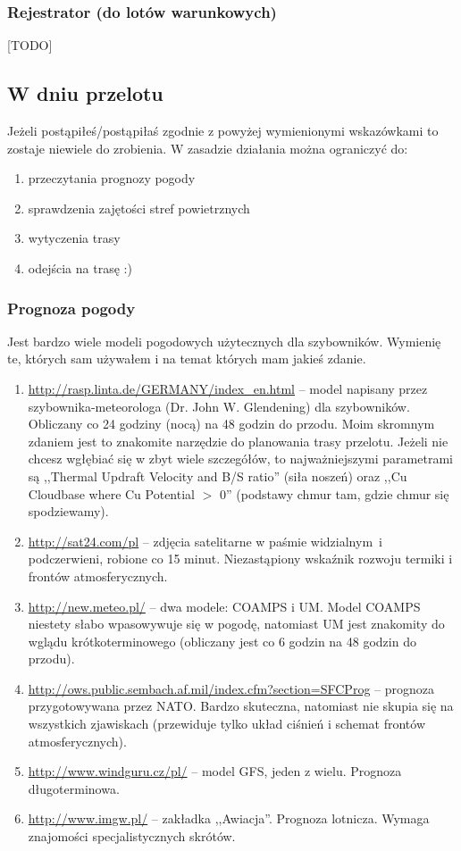 \documentclass{article}
\begin{document}
\subsubsection{Rejestrator (do lotów warunkowych)}
[TODO] %

\subsection{W dniu przelotu}
Jeżeli postąpiłeś/postąpiłaś zgodnie z powyżej wymienionymi wskazówkami to
zostaje niewiele do zrobienia. W zasadzie działania można ograniczyć do:
\begin{enumerate}
\item przeczytania prognozy pogody
\item sprawdzenia zajętości stref powietrznych
\item wytyczenia trasy
\item odejścia na trasę :)
\end{enumerate}

\subsubsection{Prognoza pogody}
Jest bardzo wiele modeli pogodowych użytecznych dla szybowników. Wymienię
te, których sam używałem i na temat których mam jakieś zdanie.
\begin{enumerate}
\item \url{http://rasp.linta.de/GERMANY/index_en.html} -- model napisany
przez szybownika-meteorologa (Dr. John W. Glendening) dla szybowników.
Obliczany co 24 godziny (nocą) na 48 godzin do przodu. Moim skromnym
zdaniem jest to znakomite narzędzie do planowania trasy przelotu.
Jeżeli nie chcesz wgłębiać się w zbyt wiele szczegółów, to najważniejszymi
parametrami są ,,Thermal Updraft Velocity and B/S ratio'' (siła noszeń) oraz
,,Cu Cloudbase where Cu Potential $>$ 0'' (podstawy chmur tam, gdzie chmur
się spodziewamy).

\item \url{http://sat24.com/pl} -- zdjęcia satelitarne w paśmie widzialnym~i
podczerwieni, robione co 15 minut. Niezastąpiony wskaźnik rozwoju termiki
i frontów atmosferycznych.

\item \url{http://new.meteo.pl/} -- dwa modele: COAMPS i UM. Model COAMPS
niestety słabo wpasowywuje się w pogodę, natomiast UM jest znakomity do
wglądu krótkoterminowego (obliczany jest co 6 godzin na 48 godzin do przodu).

\item \url{http://ows.public.sembach.af.mil/index.cfm?section=SFCProg} -- 
prognoza przygotowywana przez NATO. Bardzo skuteczna, natomiast nie
skupia się na wszystkich zjawiskach (przewiduje tylko układ ciśnień i
schemat frontów atmosferycznych).

\item \url{http://www.windguru.cz/pl/} -- model GFS, jeden z wielu.
Prognoza długoterminowa.

\item \url{http://www.imgw.pl/} -- zakładka ,,Awiacja''. Prognoza lotnicza.
Wymaga znajomości specjalistycznych skrótów.

\end{enumerate}
\end{document}
